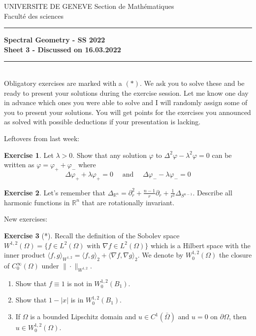 \documentclass[a4paper,11pt]{article}
\theoremstyle{definition}
\newtheorem{exercise}{Exercise}
\begin{document}
\pagestyle{headings}
\noindent UNIVERSITE DE GENEVE \hfill Section de Mathématiques\\
\noindent Facult\'e des sciences \hfill \\[-3mm]
\hrule

\large

\begin{center}
\textbf{Spectral Geometry - SS 2022 \\ Sheet 3 - Discussed on 16.03.2022}
\end{center}
\hrule
\text{}\\[1cm]

Obligatory exercises are marked with a $(*)$. We ask you to solve these and be ready to present your solutions during the exercise session. Let me know one day in advance which ones you were able to solve and I will randomly assign some of you to present your solutions. You will get points for the exercises you announced as solved with possible deductions if your presentation is lacking.

Leftovers from last week:

\begin{exercise}
	Let $\lambda > 0$. Show that any solution $\varphi$ to $\Delta^2 \varphi - \lambda^2 \varphi = 0$ can be written as $\varphi = \varphi_+ + \varphi_-$ where
	\[ \Delta \varphi_+ + \lambda \varphi_+ = 0  \quad \text{ and } \quad \Delta \varphi_- - \lambda \varphi_- = 0 \]
\end{exercise}

\begin{exercise}
	Let's remember that $\Delta_{\mathbb{R}^n} = \partial^2_r + \frac{n-1}{r} \partial_r + \frac{1}{r^2} \Delta_{S^{n-1}}$. Describe all harmonic functions in $\mathbb{R}^n$ that are rotationally invariant.
\end{exercise}


New exercises:

\begin{exercise}[*]
	Recall the definition of the Sobolev space $W^{1,2}(\Omega) = \{f \in L^2(\Omega) \text{ with } \nabla f \in L^2(\Omega)\}$ which is a Hilbert space with the inner product $\langle f, g \rangle_{W^{1,2}} = \langle f, g \rangle_2 + \langle \nabla f, \nabla g \rangle_2$. We denote by $W^{1,2}_0(\Omega)$ the closure of $C^\infty_0(\Omega)$ under $\|\cdot\|_{W^{1,2}}$.
	\begin{enumerate}
		\item Show that $f \equiv 1$ is not in $W^{1,2}_0(B_1)$.
		\item Show that $1-|x|$ is in $W^{1,2}_0(B_1)$.
		\item If $\Omega$ is a bounded Lipschitz domain and $u \in C^1(\bar{\Omega})$ and $u=0$ on $\partial \Omega$, then $u \in W^{1,2}_0(\Omega)$.
	\end{enumerate}
\end{exercise}
\end{document}
